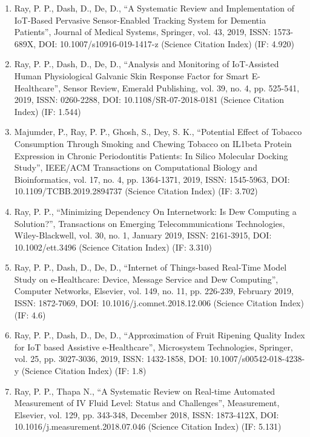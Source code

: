 \documentclass[11pt,a4paper]{moderncv}
\begin{document}
\begin{adjustwidth}{6em}{0pt}
\begin{enumerate}
		\item Ray, P. P., Dash, D., De, D., “A Systematic Review and Implementation of IoT-Based Pervasive Sensor-Enabled Tracking System for Dementia Patients”, Journal of Medical Systems, Springer, vol. 43, 2019, ISSN: 1573-689X, DOI: 10.1007/s10916-019-1417-z (Science Citation Index) (IF: 4.920) 
		
		\item Ray, P. P., Dash, D., De, D., “Analysis and Monitoring of IoT-Assisted Human Physiological Galvanic Skin Response Factor for Smart E-Healthcare”, Sensor Review, Emerald Publishing, vol. 39, no. 4, pp. 525-541, 2019, ISSN: 0260-2288, DOI: 10.1108/SR-07-2018-0181 (Science Citation Index) (IF: 1.544) 
		
		\item Majumder, P., Ray, P. P., Ghosh, S., Dey, S. K., “Potential Effect of Tobacco Consumption Through Smoking and Chewing Tobacco on IL1beta Protein Expression in Chronic Periodontitis Patients: In Silico Molecular Docking Study”, IEEE/ACM Transactions on Computational Biology and Bioinformatics, vol. 17, no. 4, pp. 1364-1371, 2019, ISSN: 1545-5963, DOI: 10.1109/TCBB.2019.2894737 (Science Citation Index) (IF: 3.702)
		
		\item Ray, P. P., “Minimizing Dependency On Internetwork: Is Dew Computing a Solution?”, Transactions on Emerging Telecommunications Technologies, Wiley-Blackwell, vol. 30, no. 1, January 2019, ISSN: 2161-3915, DOI: 10.1002/ett.3496 (Science Citation Index) (IF: 3.310)
		
		\item Ray, P. P., Dash, D., De, D., “Internet of Things-based Real-Time Model Study on e-Healthcare: Device, Message Service and Dew Computing”, Computer Networks, Elsevier, vol. 149, no. 11, pp. 226-239, February 2019, ISSN: 1872-7069, DOI: 10.1016/j.comnet.2018.12.006 (Science Citation Index) (IF: 4.6)
		
		\item Ray, P. P., Dash, D., De, D., “Approximation of Fruit Ripening Quality Index for IoT based Assistive e-Healthcare”, Microsystem Technologies, Springer, vol. 25, pp. 3027-3036, 2019, ISSN: 1432-1858, DOI: 10.1007/s00542-018-4238-y (Science Citation Index) (IF: 1.8)
		
		\item Ray, P. P., Thapa N., “A Systematic Review on Real-time Automated Measurement of IV Fluid Level: Status and Challenges”, Measurement, Elsevier, vol. 129, pp. 343-348, December 2018, ISSN: 1873-412X, DOI: 10.1016/j.measurement.2018.07.046 (Science Citation Index) (IF: 5.131)
		

\end{enumerate}
\end{adjustwidth}
\end{document}

